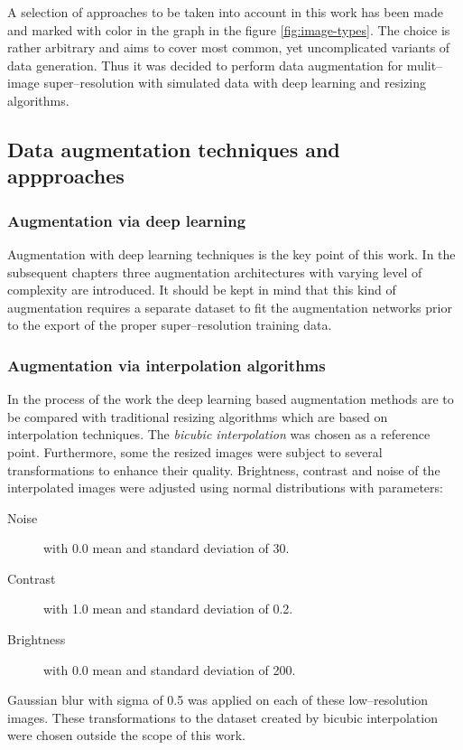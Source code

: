 A selection of approaches to be taken into account in this work has been made and marked with color in the graph in the figure \ref{fig:image-types}.
The choice is rather arbitrary and aims to cover most common, yet uncomplicated variants of data generation.
Thus it was decided to perform data augmentation for mulit--image super--resolution with simulated data with deep learning and resizing algorithms.

\subsection{Data augmentation techniques and appproaches}
\subsubsection{Augmentation via deep learning}
Augmentation with deep learning techniques is the key point of this work.
In the subsequent chapters three augmentation architectures with varying level of complexity are introduced.
It should be kept in mind that this kind of augmentation requires a separate dataset to fit the augmentation networks prior to the export of the proper super--resolution training data.

\subsubsection{Augmentation via interpolation algorithms}
In the process of the work the deep learning based augmentation methods are to be compared with traditional resizing algorithms which are based on interpolation techniques.
The \textit{bicubic interpolation} was chosen as a reference point.
Furthermore, some the resized images were subject to several transformations to enhance their quality.
Brightness, contrast and noise of the interpolated images were adjusted using normal distributions with parameters:
\begin{description}
	\item[Noise] with 0.0 mean and standard deviation of 30.
	\item[Contrast] with 1.0 mean and standard deviation of 0.2.
	\item[Brightness] with 0.0 mean and standard deviation of 200.
\end{description}
Gaussian blur with sigma of 0.5 was applied on each of these low--resolution images.
These transformations to the dataset created by bicubic interpolation were chosen outside the scope of this work.

